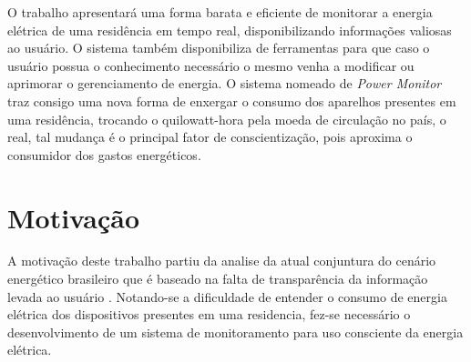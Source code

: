 
O trabalho apresentará uma forma barata e eficiente de monitorar a energia elétrica de uma residência em tempo real, disponibilizando informações valiosas ao usuário.
O sistema também disponibiliza de ferramentas para que 
caso o usuário possua o conhecimento necessário o mesmo venha a modificar ou aprimorar o gerenciamento de energia. O sistema nomeado de \textit{Power Monitor}
traz consigo uma nova forma de enxergar o consumo dos aparelhos presentes em uma residência, trocando o quilowatt-hora pela moeda de circulação no país,
o real, tal mudança é o principal fator de conscientização, pois aproxima o consumidor dos gastos energéticos.


\section{Motivação}

A motivação deste trabalho partiu da analise da atual conjuntura do cenário energético brasileiro que é baseado na falta de transparência da 
informação levada ao usuário \cite{ref-conju}. Notando-se a dificuldade de entender o consumo de energia elétrica dos dispositivos presentes em uma 
residencia, fez-se necessário o desenvolvimento de um sistema de monitoramento para uso consciente da energia elétrica.

